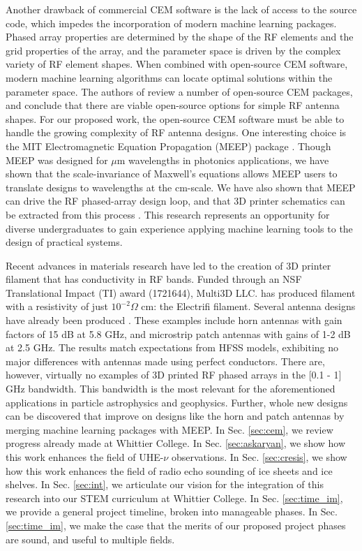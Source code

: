 \documentclass[../../main.tex]{subfiles}
\begin{document}
Another drawback of commercial CEM software is the lack of access to the source code, which impedes the incorporation of modern machine learning packages.  Phased array properties are determined by the shape of the RF elements and the grid properties of the array, and the parameter space is driven by the complex variety of RF element shapes.  When combined with open-source CEM software, modern machine learning algorithms can locate optimal solutions within the parameter space.  The authors of \cite{10.3390/electronics8121506} review a number of open-source CEM packages, and conclude that there are viable open-source options for simple RF antenna shapes.  For our proposed work, the open-source CEM software must be able to handle the growing complexity of RF antenna designs.  One interesting choice is the MIT Electromagnetic Equation Propagation (MEEP) package \cite{10.1016/j.cpc.2009.11.008}.  Though MEEP was designed for $\mu$m wavelengths in photonics applications, we have shown that the scale-invariance of Maxwell's equations allows MEEP users to translate designs to wavelengths at the cm-scale.  We have also shown that MEEP can drive the RF phased-array design loop, and that 3D printer schematics can be extracted from this process \cite{electronics10040415,meepcon2022,10.1016/j.cpc.2009.11.008}.  This research represents an opportunity for diverse undergraduates to gain experience applying machine learning tools to the design of practical systems.  \\ \vspace{2.5mm}

Recent advances in materials research have led to the creation of 3D printer filament that has conductivity in RF bands.  Funded through an NSF Translational Impact (TI) award (1721644), Multi3D LLC. has produced filament with a resistivity of just $10^{-2} \Omega$ cm: the Electrifi filament.  Several antenna designs have already been produced \cite{8786183,10.1049/iet-map.2017.0104}.  These examples include horn antennas with gain factors of 15 dB at 5.8 GHz, and microstrip patch antennas with gains of 1-2 dB at 2.5 GHz.  The results match expectations from HFSS models, exhibiting no major differences with antennas made using perfect conductors.  There are, however, virtually no examples of 3D printed RF phased arrays in the [0.1 - 1] GHz bandwidth.  This bandwidth is the most relevant for the aforementioned applications in particle astrophysics and geophysics.  Further, whole new designs can be discovered that improve on designs like the horn and patch antennas by merging machine learning packages with MEEP.  In Sec. \ref{sec:cem}, we review progress already made at Whittier College.  In Sec. \ref{sec:askaryan}, we show how this work enhances the field of UHE-$\nu$ observations.  In Sec. \ref{sec:cresis}, we show how this work enhances the field of radio echo sounding of ice sheets and ice shelves.  In Sec. \ref{sec:int}, we articulate our vision for the integration of this research into our STEM curriculum at Whittier College.  In Sec. \ref{sec:time_im}, we provide a general project timeline, broken into manageable phases.  In Sec. \ref{sec:time_im}, we make the case that the merits of our proposed project phases are sound, and useful to multiple fields.
\end{document}
